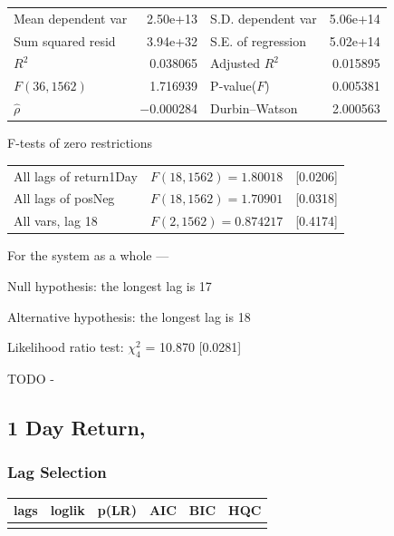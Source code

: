 \begin{center}
\vspace{1ex}
\begin{tabular}{lrlr}
Mean dependent var &  2.50\textrm{e+13} & S.D. dependent var &  5.06\textrm{e+14} \\
Sum squared resid &  3.94\textrm{e+32} & S.E. of regression &  5.02\textrm{e+14} \\
$R^2$ &  0.038065 & Adjusted $R^2$ &  0.015895 \\
$F(36, 1562)$ &  1.716939 & P-value($F$) &  0.005381 \\
$\hat{\rho}$ & $-$0.000284 & Durbin--Watson &  2.000563 \\
\end{tabular}


\end{center}

\begin{center}
F-tests of zero restrictions\\[1em]
\begin{tabular}{lll}
All lags of return1Day & $F(18, 1562) = 1.80018$ & [0.0206]\\
All lags of posNeg & $F(18, 1562) = 1.70901$ & [0.0318]\\
All vars, lag 18 & $F(2, 1562) = 0.874217$ & [0.4174]\\
\end{tabular}
\end{center}

\clearpage


\noindent For the system as a whole ---\par
Null hypothesis: the longest lag is 17\par
Alternative hypothesis: the longest lag is 18\par
Likelihood ratio test: $\chi^2_{4}$ = 10.870 [0.0281]\par    

TODO -
\subsection{1 Day Return, }

\subsubsection{Lag Selection}

\begin{center}
\begin{tabular}{ c c c c c c }
lags & loglik & p(LR) & AIC & BIC & HQC \\
\hline
\arrayrulecolor{red}\hline
\arrayrulecolor{red}\hline
\end{tabular}
\end{center}

